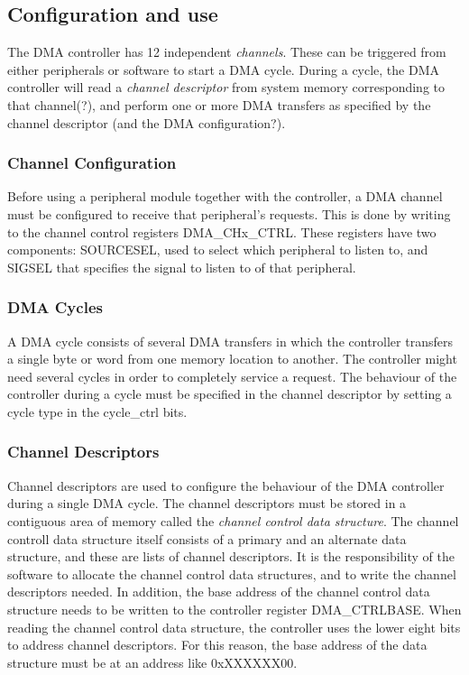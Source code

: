 \subsection{Configuration and use}
The DMA controller has 12 independent \emph{channels}. These can be triggered from either peripherals or software to start a DMA cycle. During a cycle, the DMA controller will read a \emph{channel descriptor} from system memory corresponding to that channel(?), and perform one or more DMA transfers as specified by the channel descriptor (and the DMA configuration?).

\subsubsection{Channel Configuration}
Before using a peripheral module together with the controller, a DMA channel must be configured to receive that peripheral's requests. This is done by writing to the channel control registers DMA\_CHx\_CTRL. These registers have two components: SOURCESEL, used to select which peripheral to listen to, and SIGSEL that specifies the signal to listen to of that peripheral.

\subsubsection{DMA Cycles}
A DMA cycle consists of several DMA transfers in which the controller transfers a single byte or word from one memory location to another. The controller might need several cycles in order to completely service a request. The behaviour of the controller during a cycle must be specified in the channel descriptor by setting a cycle type in the cycle\_ctrl bits.

\subsubsection{Channel Descriptors}
Channel descriptors are used to configure the behaviour of the DMA controller during a single DMA cycle. The channel descriptors must be stored in a contiguous area of memory called the \emph{channel control data structure}. The channel controll data structure itself consists of a primary and an alternate data structure, and these are lists of channel descriptors. It is the responsibility of the software to allocate the channel control data structures, and to write the channel descriptors needed. In addition, the base address of the channel control data structure needs to be written to the controller register DMA\_CTRLBASE. When reading the channel control data structure, the controller uses the lower eight bits to address channel descriptors. For this reason, the base address of the data structure must be at an address like 0xXXXXXX00.

